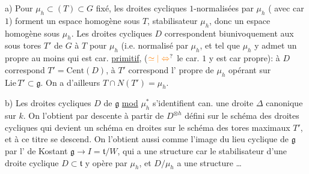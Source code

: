 a) Pour $\mu_h\subset(T)\subset G$ fixé, les droites cycliques  $1$-normalisées par $\mu_h$ ( avec car $1$) forment un espace homogène sous $T$, stabilisateur $\mu_h$, donc un espace homogène sous $\mu_h$.
Les droites cycliques $D$ correspondent biunivoquement aux sous tores $T'$ de $G$   à $T$ pour $\mu_h$ (i.e. normalisé par $\mu_h$, et tel que $\mu_h$ y admet un  propre au moins qui est  car. \uline{primitif}, ($\unsure{\simeq|\Leftrightarrow}$ le car. $1$ y est car propre): à $D$ correspond $T'=\mathrm{Cent}(D)$, à $T'$ correspond l' propre de $\mu_h$ opérant sur  $\mathrm{Lie}\,T'\subset\mathfrak g$. On a d'ailleurs $T\cap N(T')=\mu_h$.

b) Les droites cycliques $D$ de $\mathfrak g$ \uline{mod} $\mu_h^*$ s'identifient can.  une droite $\Delta$ canonique sur $k$. On l'obtient par descente à partir de $D^{\otimes h}$ défini sur le schéma des droites cycliques qui devient un schéma en droites sur le schéma des tores maximaux $T'$, et à ce titre se descend.
On l'obtient aussi comme l'image du lieu cyclique de $\mathfrak g$ par l' de Kostant $\mathfrak g\longrightarrow I=\mathfrak t/W$, qui a une structure   car le stabilisateur  d'une droite cyclique $D\subset\mathfrak t$ y opère par $\mu_h$, et $D/\mu_h$ a une structure  \ldots

